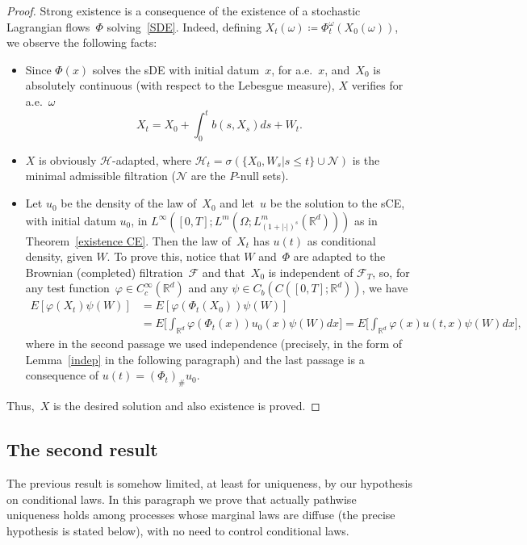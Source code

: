 \documentclass[a4paper,10pt]{article}
\newcommand\1{\mathbbm{1}}
\newcommand{\mc}{\mathcal}
\numberwithin{equation}{section}
\begin{document}
\begin{proof}
Strong existence is a consequence of the existence of a stochastic Lagrangian flows~$\Phi$ solving~\eqref{SDE}. Indeed, defining $X_t(\omega)\coloneqq \Phi_t^\omega(X_0(\omega))$, we observe the following facts: 
\begin{itemize}
\item Since $\Phi(x)$ solves the sDE with initial datum~$x$, for a.e.~$x$, and~$X_0$ is absolutely continuous (with respect to the Lebesgue measure), $X$ verifies for a.e.~$\omega$
\begin{equation*}
X_t=X_0+\int^t_0 b(s,X_s)ds+W_t.
\end{equation*}
\item $X$ is obviously $\mc{H}$-adapted, where $\mc{H}_t=\sigma(\{X_0,W_s|s\le t\}\cup\mathcal{N})$ is the minimal admissible filtration ($\mathcal{N}$ are the $P$-null sets).
\item Let $u_0$ be the density of the law of~$X_0$ and let~$u$ be the solution to the sCE, with initial datum $u_0$, in $L^\infty([0,T];L^m(\Omega;L^m_{(1+|\cdot|)^s}(\mathbb{R}^d)))$  as in Theorem~\ref{existence CE}. Then the law of~$X_t$ has $u(t)$ as conditional density, given $W$. To prove this, notice that $W$ and~$\Phi$ are adapted to the Brownian (completed) filtration~$\mc{F}$ and that~$X_0$ is independent of $\mc{F}_T$, so, for any test function~$\varphi \in C_c^\infty(\mathbb{R}^d)$ and any $\psi \in C_b(C([0,T];\mathbb{R}^d))$, we have\begin{align*}
E[\varphi(X_t)\psi(W)] & =E[\varphi(\Phi_t(X_0))\psi(W)]  \\
  & = E\Big[\int_{\mathbb{R}^d}\varphi(\Phi_t(x))u_0(x)\psi(W)dx\Big] =E\Big[\int_{\mathbb{R}^d}\varphi(x)u(t,x)\psi(W)dx\Big],
\end{align*}
where in the second passage we used independence (precisely, in the form of Lemma~\ref{indep} in the following paragraph) and the last passage is a consequence of $u(t)=(\Phi_t)_\#u_0$.
\end{itemize}
Thus,~$X$ is the desired solution and also existence is proved.
\end{proof}


\subsection{The second result}\label{secondpathwise}

The previous result is somehow limited, at least for uniqueness, by our hypothesis on conditional laws. In this paragraph we prove that actually pathwise uniqueness holds among processes whose marginal laws are diffuse (the precise hypothesis is stated below), with no need to control conditional laws.
\end{document}
